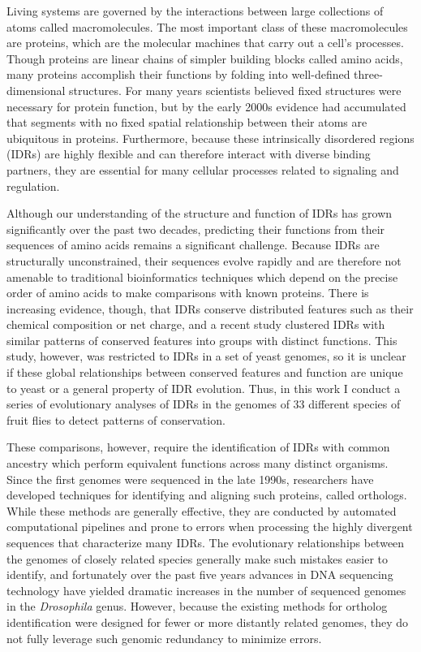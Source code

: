 \documentclass[11pt,letterpaper,oneside]{book}
\begin{document}
Living systems are governed by the interactions between large collections of atoms called macromolecules. The most important class of these macromolecules are proteins, which are the molecular machines that carry out a cell's processes. Though proteins are linear chains of simpler building blocks called amino acids, many proteins accomplish their functions by folding into well-defined three-dimensional structures. For many years scientists believed fixed structures were necessary for protein function, but by the early 2000s evidence had accumulated that segments with no fixed spatial relationship between their atoms are ubiquitous in proteins. Furthermore, because these intrinsically disordered regions (IDRs) are highly flexible and can therefore interact with diverse binding partners, they are essential for many cellular processes related to signaling and regulation.

Although our understanding of the structure and function of IDRs has grown significantly over the past two decades, predicting their functions from their sequences of amino acids remains a significant challenge. Because IDRs are structurally unconstrained, their sequences evolve rapidly and are therefore not amenable to traditional bioinformatics techniques which depend on the precise order of amino acids to make comparisons with known proteins. There is increasing evidence, though, that IDRs conserve distributed features such as their chemical composition or net charge, and a recent study clustered IDRs with similar patterns of conserved features into groups with distinct functions. This study, however, was restricted to IDRs in a set of yeast genomes, so it is unclear if these global relationships between conserved features and function are unique to yeast or a general property of IDR evolution. Thus, in this work I conduct a series of evolutionary analyses of IDRs in the genomes of 33 different species of fruit flies to detect patterns of conservation.

These comparisons, however, require the identification of IDRs with common ancestry which perform equivalent functions across many distinct organisms. Since the first genomes were sequenced in the late 1990s, researchers have developed techniques for identifying and aligning such proteins, called orthologs. While these methods are generally effective, they are conducted by automated computational pipelines and prone to errors when processing the highly divergent sequences that characterize many IDRs. The evolutionary relationships between the genomes of closely related species generally make such mistakes easier to identify, and fortunately over the past five years advances in DNA sequencing technology have yielded dramatic increases in the number of sequenced genomes in the \textit{Drosophila} genus. However, because the existing methods for ortholog identification were designed for fewer or more distantly related genomes, they do not fully leverage such genomic redundancy to minimize errors.
\end{document}
